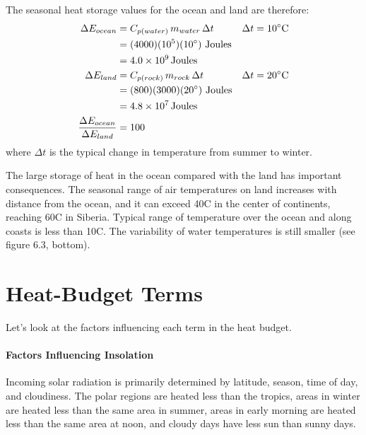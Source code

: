 The seasonal heat storage values for the
ocean and land are therefore:
\begin{align}
\Delta E_{ocean} & = C_{p(water)} \, m_{water}\, \Delta t && \Delta t =
10^{\circ} \text{C} \notag \\
                                     & = (4000) (10^5) (10^{\circ}) \text{
Joules}       \notag  \\
                                     & = 4.0 \times 10^9 \, \text{Joules}                 \notag  \\
\Delta E_{land}   & = C_{p(rock)} \, m_{rock}\, \Delta t & & \Delta t = 20^{\circ
} \text{C} \notag \\
                                     & = (800) (3000) (20^{\circ}) \text{
Joules}        \notag  \\
                                     & = 4.8 \times 10^7 \, \text{Joules}               \notag  \\
\frac{\Delta E_{ocean}}{\Delta E_{land}}  & = 100 \notag
\end{align}
where $\Delta t$ is the typical change in temperature from summer to
winter.

The large storage of heat in the ocean compared with the land has
important consequences. The seasonal range of air temperatures on land
increases with distance from the ocean, and it can exceed 40\degrees C
in the center of continents, reaching 60\degrees C in Siberia. Typical
range of temperature over the ocean and along coasts is less than
10\degrees C. The variability of water temperatures is still smaller
(see figure 6.3, bottom).

\section{Heat-Budget Terms}
Let's look at the factors influencing each
term in the heat budget.

\paragraph{Factors Influencing Insolation}
Incoming solar radiation is
primarily determined by latitude, season, time of day, and
cloudiness. The polar regions are heated less than the tropics, areas
in winter are heated less than the same area in summer, areas in early
morning are heated less than the same area at noon, and cloudy days
have less sun than sunny days.


